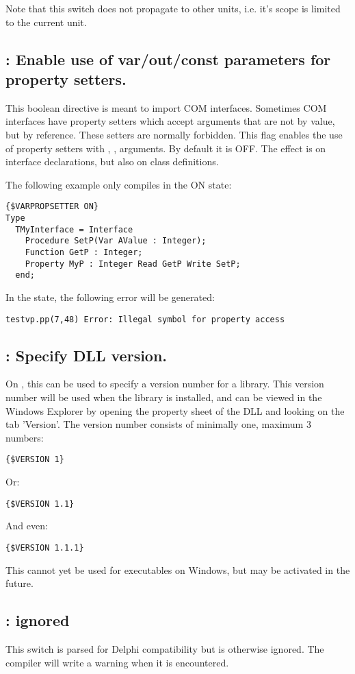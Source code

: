 Note that this switch does not propagate to other units, i.e. it's scope
is limited to the current unit.

\subsection{ : Enable use of var/out/const
parameters for property setters.}
This boolean directive is meant to import COM interfaces. Sometimes COM
interfaces have property setters which accept arguments that are not by
value, but by reference. These setters are normally forbidden. This flag
enables the use of property setters with , , 
arguments. By default it is OFF. The effect is on interface declarations,
but also on class definitions.

The following example only compiles in the ON state:
\begin{verbatim}
{$VARPROPSETTER ON}
Type
  TMyInterface = Interface
    Procedure SetP(Var AValue : Integer);
    Function GetP : Integer;
    Property MyP : Integer Read GetP Write SetP;
  end;
\end{verbatim}
In the  state, the following error will be generated:
\begin{verbatim}
testvp.pp(7,48) Error: Illegal symbol for property access
\end{verbatim}

\subsection{ : Specify DLL version.}
On \windows, this can be used to specify a version number for a library.
This version number will be used when the library is installed, and can be
viewed in the Windows Explorer by opening the property sheet of the DLL and
looking on the tab 'Version'. The version number consists of minimally one,
maximum 3 numbers:
\begin{verbatim}
{$VERSION 1}
\end{verbatim}
Or:
\begin{verbatim}
{$VERSION 1.1}
\end{verbatim}
And even:
\begin{verbatim}
{$VERSION 1.1.1}
\end{verbatim}
This cannot yet be used for executables on Windows, but may be activated in
the future.

\subsection{ : ignored}
This switch is parsed for Delphi compatibility but is otherwise ignored. 
The compiler will write a warning when it is encountered.

